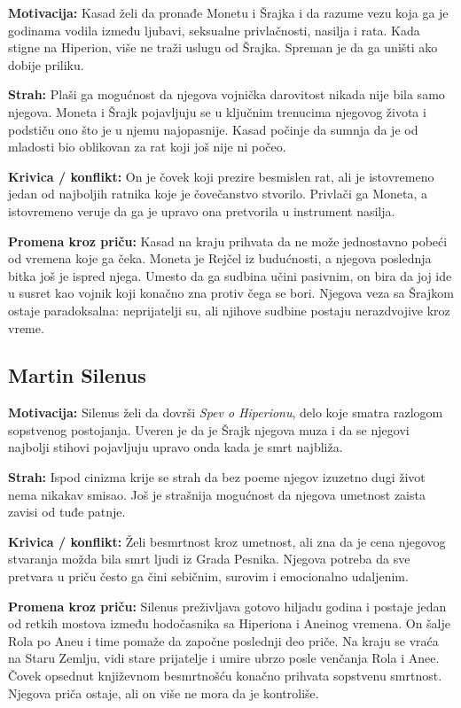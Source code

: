 \textbf{Motivacija:} Kasad želi da pronađe Monetu i Šrajka i da razume vezu koja ga je godinama vodila između ljubavi, seksualne privlačnosti, nasilja i rata. Kada stigne na Hiperion, više ne traži uslugu od Šrajka. Spreman je da ga uništi ako dobije priliku.

\textbf{Strah:} Plaši ga mogućnost da njegova vojnička darovitost nikada nije bila samo njegova. Moneta i Šrajk pojavljuju se u ključnim trenucima njegovog života i podstiču ono što je u njemu najopasnije. Kasad počinje da sumnja da je od mladosti bio oblikovan za rat koji još nije ni počeo.

\textbf{Krivica / konflikt:} On je čovek koji prezire besmislen rat, ali je istovremeno jedan od najboljih ratnika koje je čovečanstvo stvorilo. Privlači ga Moneta, a istovremeno veruje da ga je upravo ona pretvorila u instrument nasilja.

\textbf{Promena kroz priču:} Kasad na kraju prihvata da ne može jednostavno pobeći od vremena koje ga čeka. Moneta je Rejčel iz budućnosti, a njegova poslednja bitka još je ispred njega. Umesto da ga sudbina učini pasivnim, on bira da joj ide u susret kao vojnik koji konačno zna protiv čega se bori. Njegova veza sa Šrajkom ostaje paradoksalna: neprijatelji su, ali njihove sudbine postaju nerazdvojive kroz vreme.


\subsection*{Martin Silenus}

\textbf{Motivacija:} Silenus želi da dovrši \emph{Spev o Hiperionu}, delo koje smatra razlogom sopstvenog postojanja. Uveren je da je Šrajk njegova muza i da se njegovi najbolji stihovi pojavljuju upravo onda kada je smrt najbliža.

\textbf{Strah:} Ispod cinizma krije se strah da bez poeme njegov izuzetno dugi život nema nikakav smisao. Još je strašnija mogućnost da njegova umetnost zaista zavisi od tuđe patnje.

\textbf{Krivica / konflikt:} Želi besmrtnost kroz umetnost, ali zna da je cena njegovog stvaranja možda bila smrt ljudi iz Grada Pesnika. Njegova potreba da sve pretvara u priču često ga čini sebičnim, surovim i emocionalno udaljenim.

\textbf{Promena kroz priču:} Silenus preživljava gotovo hiljadu godina i postaje jedan od retkih mostova između hodočasnika sa Hiperiona i Aneinog vremena. On šalje Rola po Aneu i time pomaže da započne poslednji deo priče. Na kraju se vraća na Staru Zemlju, vidi stare prijatelje i umire ubrzo posle venčanja Rola i Anee. Čovek opsednut književnom besmrtnošću konačno prihvata sopstvenu smrtnost. Njegova priča ostaje, ali on više ne mora da je kontroliše.


